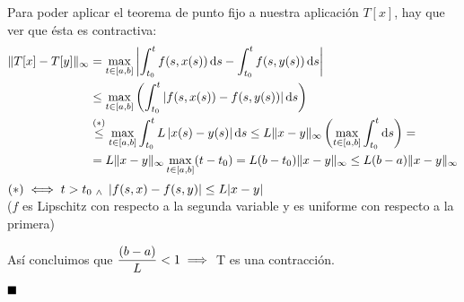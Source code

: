 Para poder aplicar el teorema de punto fijo a nuestra aplicación $T[x]$, hay que ver que ésta es contractiva:
\[\begin{aligned}
		\|T[x]-T[y]\|_{\infty} & = \max_{t \in [a,b]} \left | \int_{t_0}^t f(s,x(s))\odif{s} - \int_{t_0}^t f(s,y(s)) \odif{s} \right |                                                                  \\
		                       & \leq \max_{t\in [a,b]} \left ( \int_{t_0}^t \left | f(s,x(s))-f(s,y(s))\right | \odif{s} \right )                                                                       \\
		                       & \overset{(*)}{\leq} \max_{t\in[a,b]} \int_{t_0}^t L\left |x(s) - y(s) \right | \odif{s} \leq L\|x-y\|_{\infty} \left( \max_{t\in [a,b]} \int_{t_0}^t \odif{s} \right )= \\
		                       & = L \|x-y\|_{\infty} \max_{t\in[a,b]}(t-t_0) =L(b-t_0)\|x-y\|_{\infty} \leq L(b-a)\|x-y\|_{\infty}
	\end{aligned}\]
$(*) \iff t>t_0 \; _{\wedge} \; \left |f(s,x)-f(s,y)\right | \leq L|x-y|$
\\ \hspace*{\fill} ($f$ es Lipschitz con respecto a la segunda variable y es uniforme con respecto a la primera)

Así concluimos que $\displaystyle \frac{(b-a)}{L}<1 \implies $ T es una contracción.

$\hfill \blacksquare$


